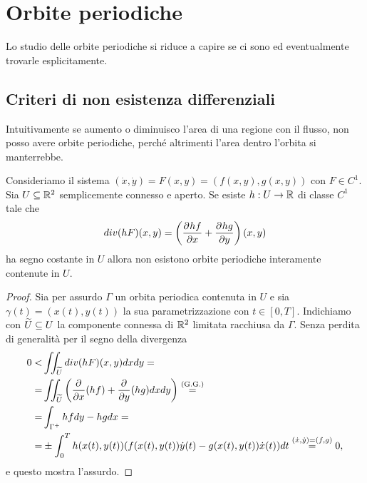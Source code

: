\chapter{Orbite periodiche}
Lo studio delle orbite periodiche si riduce a capire se ci sono ed eventualmente trovarle esplicitamente.

\section{Criteri di non esistenza differenziali}
Intuitivamente se aumento o diminuisco l'area di una regione con il flusso, non posso avere orbite periodiche, perch\'e altrimenti l'area dentro l'orbita si manterrebbe.
\begin{proposition}\label{MetodoBendixonDulec}
Consideriamo il sistema $(\dot x,\dot y)=F(x,y)=(f(x,y),g(x,y))$ con $F\in C^1$. Sia $U\subseteq \mathbb{R}^2$ semplicemente connesso e aperto. Se esiste $h:U\to \mathbb{R}$ di classe $C^1$ tale che
\[div(h F)(x,y)=\pa{\pp x{h f}+\pp y{hg}}(x,y)\]
ha segno costante in $U$ allora non esistono orbite periodiche interamente contenute in $U$.
\end{proposition}
\begin{proof}
Sia per assurdo $\Gamma$ un orbita periodica contenuta in $U$ e sia $\gamma(t)=(x(t),y(t))$ la sua parametrizzazione con $t\in[0,T]$. Indichiamo con $\widetilde{U}\subseteq U$ la componente connessa di $\mathbb{R}^2$ limitata racchiusa da $\Gamma$. Senza perdita di generalit\`a per il segno della divergenza
\begin{align*}
0<&\iint_{\wt U}div(hF)(x,y)dxdy=\\
=&\iint_{\wt U}\pa{\pp x{}(hf)+\pp y{}(hg)dxdy}\pasgnl={(G.G.)}\\
=&\int_{\Gamma^+}hfdy-hgdx=\\
=&\pm\int_0^Th(x(t),y(t))(f(x(t),y(t))\dot y(t)-g(x(t),y(t))\dot x(t))dt\pasgnlmath={(\dot x,\dot y)=(f,g)}0,
\end{align*}
e questo mostra l'assurdo.
\end{proof}

